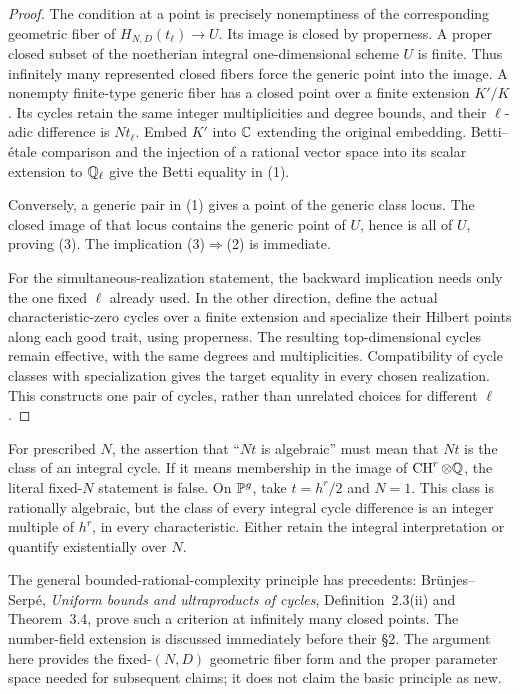 \begin{proof}
The condition at a point is precisely nonemptiness of the corresponding
geometric fiber of $H_{N,D}(t_\ell)\to U$. Its image is closed by properness.
A proper closed subset of the noetherian integral one-dimensional scheme
$U$ is finite. Thus infinitely many represented closed fibers force the
generic point into the image. A nonempty finite-type generic fiber has a
closed point over a finite extension $K'/K$. Its cycles retain the same
integer multiplicities and degree bounds, and their $\ell$-adic difference
is $Nt_\ell$. Embed $K'$ into $\mathbb C$ extending the original embedding.
Betti--\'etale comparison and the injection of a rational vector space into
its scalar extension to $\mathbb Q_\ell$ give the Betti equality in (1).

Conversely, a generic pair in (1) gives a point of the generic class locus.
The closed image of that locus contains the generic point of $U$, hence is
all of $U$, proving (3). The implication (3)$\Rightarrow$(2) is immediate.

For the simultaneous-realization statement, the backward implication needs
only the one fixed $\ell$ already used. In the other direction, define the
actual characteristic-zero cycles over a finite extension and specialize
their Hilbert points along each good trait, using properness. The resulting
top-dimensional cycles remain effective, with the same degrees and
multiplicities. Compatibility of cycle classes with specialization gives
the target equality in every chosen realization. This constructs one pair
of cycles, rather than unrelated choices for different $\ell$.
\end{proof}

\begin{remark}
For prescribed $N$, the assertion that ``$Nt$ is algebraic'' must mean that
$Nt$ is the class of an integral cycle. If it means membership in the image
of $\operatorname{CH}^r\otimes\mathbb Q$, the literal fixed-$N$ statement is false. On
$\mathbb P^g$, take $t=h^r/2$ and $N=1$. This class is rationally algebraic, but
the class of every integral cycle difference is an integer multiple of
$h^r$, in every characteristic. Either retain the integral interpretation
or quantify existentially over $N$.

The general bounded-rational-complexity principle has precedents:
Br\"unjes--Serp\'e, \emph{Uniform bounds and ultraproducts of cycles},
Definition~2.3(ii) and Theorem~3.4, prove such a criterion at infinitely
many closed points. The number-field extension is discussed immediately
before their \S2. The argument here provides the fixed-$(N,D)$ geometric
fiber form and the proper parameter space needed for subsequent claims;
it does not claim the basic principle as new.
\end{remark}

